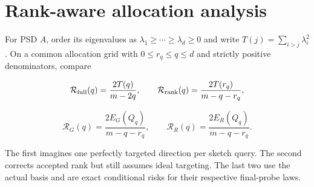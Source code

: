 \section{Rank-aware allocation analysis}\label{sec:allocation}
For PSD $A$, order its eigenvalues as $\lambda_1\ge\cdots\ge\lambda_d\ge0$ and write $T(j)=\sum_{i>j}\lambda_i^2$. On a common allocation grid with $0\le r_q\le q\le d$ and strictly positive denominators, compare


\begin{equation}
\mathcal R_{\rm full}(q)=\frac{2T(q)}{m-2q},\qquad
\mathcal R_{\rm rank}(q)=\frac{2T(r_q)}{m-q-r_q},
\end{equation}


\begin{equation}
\mathcal R_G(q)=\frac{2E_G(Q_q)}{m-q-r_q},\qquad
\mathcal R_R(q)=\frac{2E_R(Q_q)}{m-q-r_q}.
\end{equation}


The first imagines one perfectly targeted direction per sketch query. The second corrects accepted rank but still assumes ideal targeting. The last two use the actual basis and are exact conditional risks for their respective final-probe laws.


